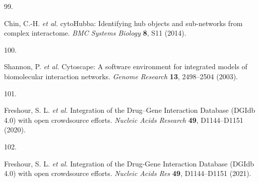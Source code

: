 \documentclass[
  11,
  a4paper,
]{article}
\newlength{\cslhangindent}
\newlength{\csllabelwidth}
\newenvironment{CSLReferences}[2] %
 {\begin{list}{}{%
  \setlength{\itemindent}{0pt}
  \setlength{\leftmargin}{0pt}
  \setlength{\parsep}{0pt}
  \ifodd #1
   \setlength{\leftmargin}{\cslhangindent}
   \setlength{\itemindent}{-1\cslhangindent}
  \fi
  \setlength{\itemsep}{#2\baselineskip}}}
 {\end{list}}
\newcommand{\CSLLeftMargin}[1]{\parbox[t]{\csllabelwidth}{\strut#1\strut}}
\newcommand{\CSLRightInline}[1]{\parbox[t]{\linewidth - \csllabelwidth}{\strut#1\strut}}
\begin{document}
\begin{CSLReferences}{0}{0}
\CSLLeftMargin{99. }%
\CSLRightInline{Chin, C.-H. \emph{et al.} {cytoHubba}: Identifying hub
objects and sub-networks from complex interactome. \emph{BMC Systems
Biology} \textbf{8}, S11 (2014).}

\CSLLeftMargin{100. }%
\CSLRightInline{Shannon, P. \emph{et al.} Cytoscape: A software
environment for integrated models of biomolecular interaction networks.
\emph{Genome Research} \textbf{13}, 2498--2504 (2003).}

\CSLLeftMargin{101. }%
\CSLRightInline{Freshour, S. L. \emph{et al.} {Integration of the
Drug--Gene Interaction Database (DGIdb 4.0) with open crowdsource
efforts}. \emph{Nucleic Acids Research} \textbf{49}, D1144--D1151
(2020).}

\CSLLeftMargin{102. }%
\CSLRightInline{Freshour, S. L. \emph{et al.} {{I}ntegration of the
{D}rug-{G}ene {I}nteraction {D}atabase ({D}{G}{I}db 4.0) with open
crowdsource efforts}. \emph{Nucleic Acids Res} \textbf{49}, D1144--D1151
(2021).}

\end{CSLReferences}
\end{document}
